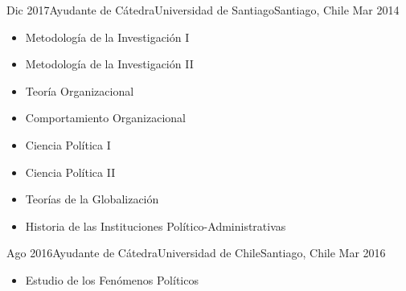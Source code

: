 \begin{experiences}
  \emptySeparator 
  \experience 
    {Dic 2017}{Ayudante de Cátedra}{Universidad de Santiago}{Santiago, Chile} {Mar 2014}
    {\begin{itemize}
    \item Metodología de la Investigación I
    \item Metodología de la Investigación II
    \item Teoría Organizacional
    \item Comportamiento Organizacional
    \item Ciencia Política I
    \item Ciencia Política II
    \item Teorías de la Globalización
    \item Historia de las Instituciones Político-Administrativas
    \end{itemize}}
    {}
\end{experiences}
\vspace{-2mm}

\begin{experiences}
  \emptySeparator 
  \experience 
    {Ago 2016}{Ayudante de Cátedra}{Universidad de Chile}{Santiago, Chile} {Mar 2016}
    {\begin{itemize}
    \item Estudio de los Fenómenos Políticos
    \end{itemize}}
    {}
\end{experiences}
